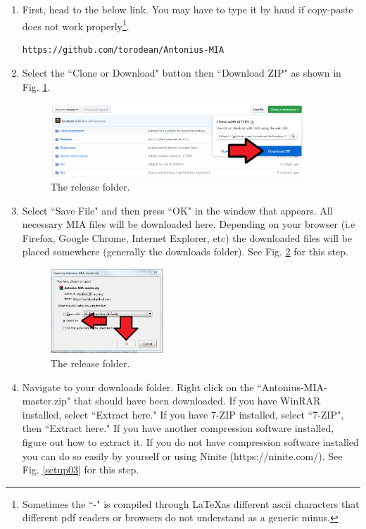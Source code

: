 \begin{enumerate}
	\item First, head to the below link. You may have to type it by hand if copy-paste does not work properly\footnote{Sometimes the ``-" is compiled through \LaTeX as different ascii characters that different pdf readers or browsers do not understand as a generic minus.}.

\begin{lstlisting}
https://github.com/torodean/Antonius-MIA
\end{lstlisting}
	
	\item Select the ``Clone or Download" button then ``Download ZIP" as shown in Fig. \ref{setup01}.
	
	\begin{figure}[h]
		\centering
		\includegraphics[width=0.9\textwidth]{images/setup01.png}
		\caption{The release folder.} \label{setup01}
	\end{figure}
	
	\item Select ``Save File" and then press ``OK" in the window that appears. All necessary MIA files will be downloaded here. Depending on your browser (i.e Firefox, Google Chrome, Internet Explorer, etc) the downloaded files will be placed somewhere (generally the downloads folder). See Fig. \ref{setup02} for this step.
	
	\begin{figure}[h]
		\centering
		\includegraphics[width=0.4\textwidth]{images/setup02.png}
		\caption{The release folder.} \label{setup02}
	\end{figure}
	
	\item Navigate to your downloads folder. Right click on the ``Antonius-MIA-master.zip" that should have been downloaded. If you have WinRAR installed, select ``Extract here." If you have 7-ZIP installed, select ``7-ZIP", then ``Extract here." If you have another compression software installed, figure out how to extract it. If you do not have compression software installed you can do so easily by yourself or using Ninite (https://ninite.com/). See Fig. \ref{setup03} for this step.
	

\end{enumerate}
